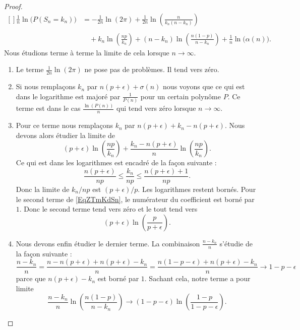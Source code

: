 \begin{proof}
\begin{equation}
		\begin{aligned}[]
			\frac{1}{ n }\ln\big( P(S_n=k_n) \big) & =-\frac{1}{ 2n }\ln(2\pi)+\frac{1}{ 2n }\ln\left( \frac{ n }{ k_n(n-k_n) } \right) \\
			\\&\quad+k_n\ln\left( \frac{ np }{ k_n } \right)+(n-k_n)\ln\left( \frac{ n(1-p) }{ n-k_n } \right)+\frac{1}{ n }\ln\big( \alpha(n) \big).
		\end{aligned}
	\end{equation}
	Nous étudions terme à terme la limite de cela lorsque \( n\to \infty\).
	\begin{enumerate}
		\item
		      Le terme \( \frac{1}{ 2n }\ln(2\pi)\) ne pose pas de problèmes. Il tend vers zéro.
		\item
		      Si nous remplaçons \( k_n\) par \( n(p+\epsilon)+\sigma(n)\) nous voyons que ce qui est dans le logarithme est majoré par \( \frac{1}{ P(n) }\) pour un certain polynôme \( P\). Ce terme est dans le cas \( \frac{ \ln(P(n)) }{ n }\) qui tend vers zéro lorsque \( n\to \infty\).
		\item
		      Pour ce terme nous remplaçons \( k_n\) par \( n(p+\epsilon)+k_n-n(p+\epsilon)\). Nous devons alors étudier la limite de
		      \begin{equation}    \label{EqZTmKdSn}
			      (p+\epsilon)\ln\left( \frac{ np }{ k_n } \right)+\frac{ k_n-n(p+\epsilon) }{ n }\ln\left( \frac{ np }{ k_n } \right).
		      \end{equation}
		      Ce qui est dans les logarithmes est encadré de la façon suivante :
		      \begin{equation}
			      \frac{ n(p+\epsilon) }{ np }\leq\frac{ k_n }{ np }\leq \frac{ n(p+\epsilon)+1 }{ np }.
		      \end{equation}
		      Donc la limite de \( k_n/np\) est \( (p+\epsilon)/p\). Les logarithmes restent bornés. Pour le second terme de \eqref{EqZTmKdSn}, le numérateur du coefficient est borné par \( 1\). Donc le second terme tend vers zéro et le tout tend vers
		      \begin{equation}
			      (p+\epsilon)\ln\left( \frac{ p }{ p+\epsilon } \right).
		      \end{equation}
		\item
		      Nous devons enfin étudier le dernier terme. La combinaison \( \frac{ n-k_n }{ n }\) s'étudie de la façon suivante :
		      \begin{equation}
			      \frac{ n-k_n }{ n }=\frac{ n-n(p+\epsilon)+n(p+\epsilon)-k_n }{ n }=\frac{ n(1-p-\epsilon)+n(p+\epsilon)-k_n }{ n }\to 1-p-\epsilon
		      \end{equation}
		      parce que \( n(p+\epsilon)-k_n\) est borné par \( 1\). Sachant cela, notre terme a pour limite
		      \begin{equation}
			      \frac{ n-k_n }{ n }\ln\left( \frac{ n(1-p) }{ n-k_n } \right)\to (1-p-\epsilon)\ln\left( \frac{ 1-p }{ 1-p-\epsilon } \right).
		      \end{equation}


\end{enumerate}
\end{proof}
